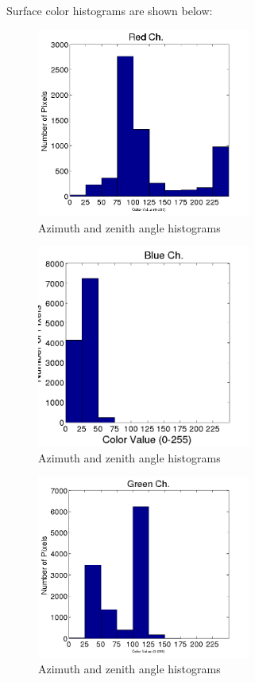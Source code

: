 \documentclass[runningheads,a4paper]{llncs}
\begin{document}
Surface color histograms are shown below:

\begin{figure}[ht]
\centering
\includegraphics[width=70mm]{imgs/red.png}
\caption{Azimuth and zenith angle histograms }
\label{fig:rxgraph}
\end{figure}

\begin{figure}[ht]
\centering
\includegraphics[width=70mm]{imgs/blue.png}
\caption{Azimuth and zenith angle histograms }
\label{fig:rxgraph}
\end{figure}

\begin{figure}[ht]
\centering
\includegraphics[width=70mm]{imgs/green.png}
\caption{Azimuth and zenith angle histograms }
\label{fig:rxgraph}
\end{figure}
\end{document}
